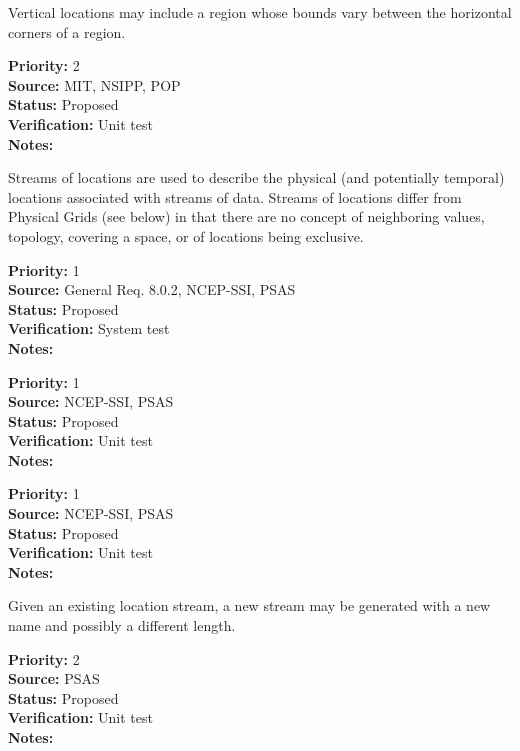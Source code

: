 
  Vertical locations may include a region whose bounds vary between the
horizontal corners of a region.
\begin{reqlist}
{\bf Priority:} 2 \\
{\bf Source:} MIT, NSIPP, POP \\
{\bf Status:} Proposed \\
{\bf Verification:} Unit test\\
{\bf Notes:} 
\end{reqlist}


Streams of locations are used to describe the physical (and potentially temporal)
locations associated with streams of data.  Streams of locations differ from
Physical Grids (see below) in that there are no concept of neighboring values,
topology, covering a space, or of locations being exclusive.
\begin{reqlist}
{\bf Priority:} 1 \\
{\bf Source:} General Req. 8.0.2, NCEP-SSI,
              PSAS \\
{\bf Status:} Proposed \\
{\bf Verification:} System test\\
{\bf Notes:} 
\end{reqlist}

\begin{reqlist}
{\bf Priority:} 1 \\
{\bf Source:} NCEP-SSI, PSAS \\
{\bf Status:} Proposed \\
{\bf Verification:} Unit test \\
{\bf Notes:} 
\end{reqlist}

\begin{reqlist}
{\bf Priority:} 1 \\
{\bf Source:} NCEP-SSI, PSAS \\
{\bf Status:} Proposed \\
{\bf Verification:} Unit test \\
{\bf Notes:} 
\end{reqlist}

Given an existing location stream, a new stream may be generated with a new name and
possibly a different length.
\begin{reqlist}
{\bf Priority:} 2 \\
{\bf Source:} PSAS\\
{\bf Status:} Proposed \\
{\bf Verification:} Unit test \\
{\bf Notes:} 
\end{reqlist}

